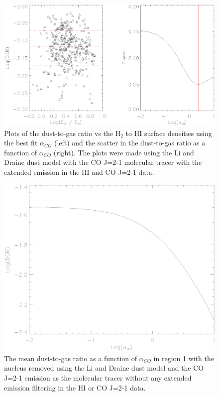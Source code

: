  \begin{figure}
   \centering
   \includegraphics[width=1.\textwidth]{dgr_imgs/region_1-3_aco_output_21_no_filt.eps}
   \caption{Plots of the dust-to-gas ratio vs the H$_2$ to HI surface densities using the best fit $\alpha_{CO}$ (left) and the scatter in the dust-to-gas ratio as a function of $\alpha_{CO}$ (right).  The plots were made using the Li and Draine dust model with the CO J=2-1 molecular tracer with the extended emission in the HI and CO J=2-1 data.}
   \label{fig:filt_dgr}
\end{figure}
 
 \begin{figure}
   \centering
   \includegraphics[width=1.\textwidth]{dgr_imgs/region_1-3_aco_dgr_nf.eps}
   \caption[Mean Dust-to-Gas Ratio vs $\alpha_{CO}$ Without Extended Emission Filtering]{The mean dust-to-gas ratio as a function of $\alpha_{CO}$ in region 1 with the nucleus removed using the Li and Draine dust model and the CO J=2-1 emission as the molecular tracer without any extended emission filtering in the HI or CO J=2-1 data.} 
    \label{fig:filt_aco_dgr}
\end{figure}
 
